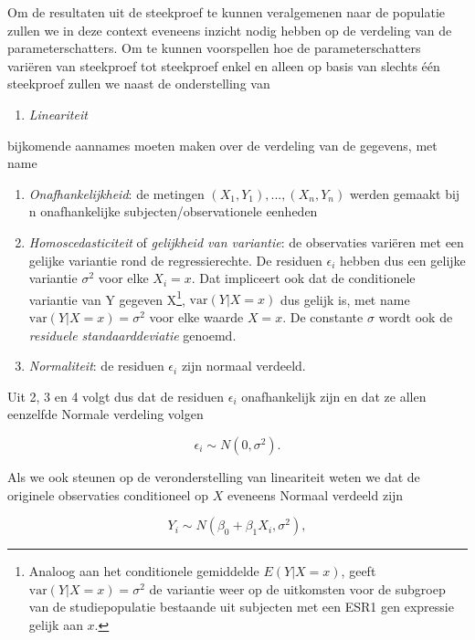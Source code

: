 \documentclass[
  dutch,
  letterpaper,
  12pt]{book}
\providecommand{\tightlist}{%
  \setlength{\itemsep}{0pt}\setlength{\parskip}{0pt}}
\theoremstyle{definition}
\theoremstyle{definition}
\theoremstyle{definition}
\theoremstyle{remark}
\begin{document}
Om de resultaten uit de steekproef te kunnen veralgemenen naar de
populatie zullen we in deze context eveneens inzicht nodig hebben op de
verdeling van de parameterschatters. Om te kunnen voorspellen hoe de
parameterschatters variëren van steekproef tot steekproef enkel en
alleen op basis van slechts één steekproef zullen we naast de
onderstelling van

\begin{enumerate}
\def\labelenumi{\arabic{enumi}.}
\tightlist
\item
  \emph{Lineariteit}
\end{enumerate}

bijkomende aannames moeten maken over de verdeling van de gegevens, met
name

\begin{enumerate}
\def\labelenumi{\arabic{enumi}.}
\setcounter{enumi}{1}
\tightlist
\item
  \emph{Onafhankelijkheid}: de metingen \((X_1,Y_1), ...,  (X_n,Y_n)\)
  werden gemaakt bij n onafhankelijke subjecten/observationele eenheden
\item
  \emph{Homoscedasticiteit} of \emph{gelijkheid van variantie}: de
  observaties variëren met een gelijke variantie rond de
  regressierechte. De residuen \(\epsilon_i\) hebben dus een gelijke
  variantie \(\sigma^2\) voor elke \(X_i=x\). Dat impliceert ook dat de
  conditionele variantie van Y gegeven X\footnote{Analoog aan het
    conditionele gemiddelde \(E(Y|X=x)\), geeft
    \(\text{var}(Y\vert X=x) = \sigma^2\) de variantie weer op de
    uitkomsten voor de subgroep van de studiepopulatie bestaande uit
    subjecten met een ESR1 gen expressie gelijk aan \(x\).},
  \(\text{var}(Y\vert X=x)\) dus gelijk is, met name
  \(\text{var}(Y\vert X=x) = \sigma^2\) voor elke waarde \(X=x\). De
  constante \(\sigma\) wordt ook de \emph{residuele standaarddeviatie}
  genoemd.
\item
  \emph{Normaliteit}: de residuen \(\epsilon_i\) zijn normaal verdeeld.
\end{enumerate}

Uit 2, 3 en 4 volgt dus dat de residuen \(\epsilon_i\) onafhankelijk
zijn en dat ze allen eenzelfde Normale verdeling volgen

\[\epsilon_i \sim N(0,\sigma^2).\]

Als we ook steunen op de veronderstelling van lineariteit weten we dat
de originele observaties conditioneel op \(X\) eveneens Normaal verdeeld
zijn

\[Y_i\sim N(\beta_0+\beta_1 X_i,\sigma^2),\]
\end{document}

